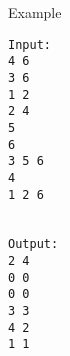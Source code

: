 Example
\begin{verbatim}
Input:
4 6
3 6
1 2
2 4
5
6
3 5 6
4
1 2 6


Output:
2 4
0 0
0 0
3 3
4 2
1 1

\end{verbatim}